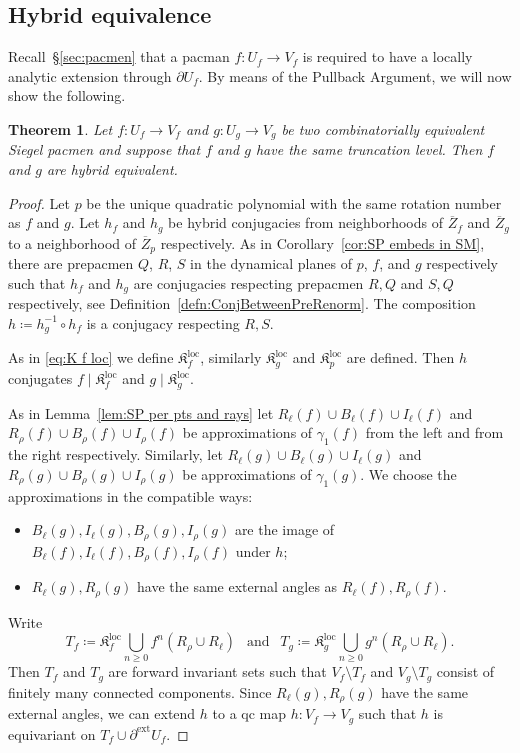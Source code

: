 \documentclass[]{amsart}
\renewcommand{\sp}{{\ \ }}
\newcommand\Kfilled{{\mathfrak K}}
\newcommand\ext{{\operatorname{ext}}}
\newtheorem{thm}{Theorem}[section]
\theoremstyle{remark}
\numberwithin{equation}{section}
\theoremstyle{definition}
\def\loc{{\mathrm{loc}}}
\begin{document}
\subsection{Hybrid equivalence}
Recall~\S\ref{sec:pacmen} that a pacman $f\colon U_f\to V_f$ is required to have a locally analytic extension through $\partial U_f$. By means of the Pullback Argument, we will now show the following.

\begin{thm}
\label{thm:HyrbrEquivOfPacm}
Let $f\colon U_f\to V_f$ and $g\colon U_g\to V_g$  be two combinatorially equivalent Siegel pacmen and suppose that $f$ and $g$ have the same truncation level.  
  Then $f$ and $g$ are hybrid equivalent.    
\end{thm}
\begin{proof}
Let $p$ be the unique quadratic polynomial with the same rotation number as $f$ and $g$. Let $h_f$ and $h_g$ be hybrid conjugacies from neighborhoods of $\overline Z_f$ and $\overline Z_g$ to a neighborhood of $\overline Z_p$ respectively. As in Corollary~\ref{cor:SP embeds in SM}, there are prepacmen $Q$, $R$, $S$ in the dynamical planes of $p$, $f$, and $g$ respectively such that $h_f$ and $h_g$ are conjugacies respecting prepacmen $R,Q$ and  $S,Q$ respectively, see Definition~\ref{defn:ConjBetweenPreRenorm}. The composition $h\coloneqq h_g^{-1}\circ h_f$ is a conjugacy respecting $R, S$.


As in \eqref{eq:K f loc} we define $\Kfilled^\loc_f$, similarly $\Kfilled^\loc_g$ and $\Kfilled^\loc_p$ are defined. Then $h$ conjugates $f\mid \Kfilled^\loc_f$ and $g\mid \Kfilled^\loc_g$. 

As in Lemma~\ref{lem:SP per pts and rays} let $ R_\ell(f) \cup B_\ell(f)\cup I_\ell(f)$ and $R_\rho (f)\cup B_\rho(f)\cup I_\rho(f)$ be approximations of $\gamma_1(f)$ from the left and  from the right respectively. Similarly, let $ R_\ell(g) \cup B_\ell(g)\cup I_\ell(g)$ and $R_\rho (g)\cup B_\rho(g)\cup I_\rho(g)$ be approximations of $\gamma_1(g)$. We choose the approximations in the compatible ways:
\begin{itemize}
\item  $B_\ell(g),I_\ell(g), B_\rho(g),I_\rho (g)$ are the image of $B_\ell(f),I_\ell(f), B_\rho(f),I_\rho (f)$ under $h$;
\item $R_\ell(g),R_\rho(g)$ have the same external angles as $R_\ell(f),R_\rho(f)$.
\end{itemize}

Write \[T_f\coloneqq \Kfilled^{\loc}_f \bigcup_{n\ge 0} f^n(R_\rho\cup R_\ell )\sp \text{ and }\sp T_g\coloneqq \Kfilled^{\loc}_g \bigcup_{n\ge 0} g^n(R_\rho\cup R_\ell ).\]
Then $T_f$ and $T_g$ are forward invariant sets such that $V_f\setminus T_f$ and $V_g\setminus T_g$ consist of finitely many connected components. Since $R_\ell(g),R_\rho(g)$ have the same external angles, we can extend $h$ to a qc map $h\colon V_f\to V_g$ such that $h$ is equivariant on $ T_f\cup \partial^\ext U_f$.







\end{proof}
\end{document}
